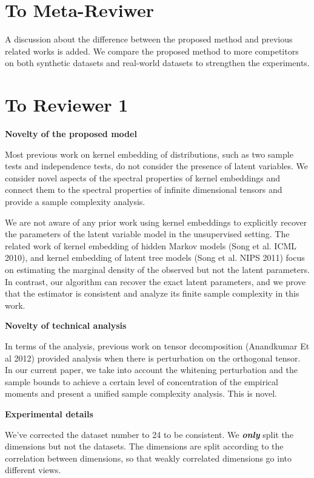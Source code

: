 \documentclass{article}
\begin{document}
\section*{To Meta-Reviwer}
A discussion about the difference between the proposed method and previous related works is added. We compare the proposed method to more competitors on both synthetic datasets and real-world datasets to strengthen the experiments.

\section*{To Reviewer 1}

\textbf{Novelty of the proposed model}

Most previous work on kernel embedding of distributions, such as two sample tests and independence tests, do not consider the presence of latent variables. We consider novel aspects of the spectral properties of kernel embeddings and connect them to the spectral properties of infinite dimensional tensors and provide a sample complexity analysis.

We are not aware of any prior work using kernel embeddings to explicitly recover the parameters of the latent variable model in the unsupervised setting. The related work of kernel embedding of hidden Markov models (Song et al. ICML 2010), and kernel embedding of latent tree models (Song et al. NIPS 2011) focus on estimating the marginal density of the observed but not the latent parameters. In contrast, our algorithm can recover the exact latent parameters, and we prove that the estimator is consistent and analyze its finite sample complexity in this work.

\noindent\textbf{Novelty of technical analysis}

In terms of the analysis, previous work on tensor decomposition (Anandkumar Et al 2012) provided analysis when there is perturbation on the orthogonal tensor. In our current paper, we take into account the whitening perturbation and the sample bounds to achieve a certain level of concentration of the empirical moments and present a unified sample complexity analysis. This is novel.

\noindent\textbf{Experimental details}

We've corrected the dataset number to 24 to be consistent. We {\bf \emph{only}} split the dimensions but not the datasets. The dimensions are split according to the correlation between dimensions, so that weakly correlated dimensions go into different views.
\end{document}
